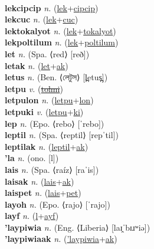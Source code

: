  \label{lekcohpoltilum} \\
\textbf{lekcipcip} \textit{n.} (\hyperref[lek]{lek}+\hyperref[cipcip]{cipcip})
 \label{lekcipcip} \\
\textbf{lekcuc} \textit{n.} (\hyperref[lek]{lek}+\hyperref[cuc]{cuc})
 \label{lekcuc} \\
\textbf{lektokalyot} \textit{n.} (\hyperref[lek]{lek}+\hyperref[tokalyot]{tokalyot})
 \label{lektokalyot} \\
\textbf{lekpoltilum} \textit{n.} (\hyperref[lek]{lek}+\hyperref[poltilum]{poltilum})
 \label{lekpoltilum} \\
\textbf{let} \textit{n.} (Spa. ⟨red⟩ [reð])
 \label{let} \\
\textbf{letak} \textit{n.} (\hyperref[let]{let}+\hyperref[ak]{ak})
 \label{letak} \\
\textbf{letus} \textit{n.} (Ben. ⟨লেটুস⟩ [l̪etus̪])
 \label{letus} \\
\textbf{letpu} \textit{v.} (\hyperref[tolmi]{\sout{tolmi}})
 \label{letpu} \\
\textbf{letpulon} \textit{n.} (\hyperref[letpu]{letpu}+\hyperref[lon]{lon})
 \label{letpulon} \\
\textbf{letpuki} \textit{v.} (\hyperref[letpu]{letpu}+\hyperref[ki]{ki})
 \label{letpuki} \\
\textbf{lep} \textit{n.} (Epo. ⟨rebo⟩ [ˈrebo])
 \label{lep} \\
\textbf{leptil} \textit{n.} (Spa. ⟨reptil⟩ [repˈtil])
 \label{leptil} \\
\textbf{leptilak} \textit{n.} (\hyperref[leptil]{leptil}+\hyperref[ak]{ak})
 \label{leptilak} \\
\textbf{'la} \textit{n.} (ono. [l])
 \label{'la} \\
\textbf{lais} \textit{n.} (Spa. ⟨raíz⟩ [raˈis])
 \label{lais} \\
\textbf{laisak} \textit{n.} (\hyperref[lais]{lais}+\hyperref[ak]{ak})
 \label{laisak} \\
\textbf{laispet} \textit{n.} (\hyperref[lais]{lais}+\hyperref[pet]{pet})
 \label{laispet} \\
\textbf{layoh} \textit{n.} (Epo. ⟨rajo⟩ [ˈrajo])
 \label{layoh} \\
\textbf{layf} \textit{n.} (\hyperref[l]{l}+\hyperref[ayf]{ayf})
 \label{layf} \\
\textbf{'laypiwia} \textit{n.} (Eng. ⟨Liberia⟩ [laɪ̯ˈbɪɹʷiə])
 \label{'laypiwia} \\
\textbf{'laypiwiaak} \textit{n.} (\hyperref['laypiwia]{'laypiwia}+\hyperref[ak]{ak})
